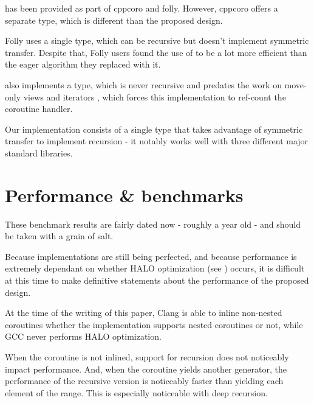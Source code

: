 \documentclass{wg21}
\begin{document}
 has been provided as part of cppcoro and folly.
However, cppcoro offers a separate  type, which is different than the proposed design.

Folly uses a single  type, which can be recursive but doesn't implement symmetric transfer. Despite that,
Folly users found the use of  to be a lot more efficient than the eager algorithm they replaced with it.

 also implements a  type, which is never recursive and predates the work on move-only views and
iterators \cite{P1456R1}, \cite{P1207R0} which forces this implementation to ref-count the coroutine handler.

Our implementation \cite{Implementation} consists of a single type that takes advantage of symmetric transfer to implement
recursion - it notably works well with three different major standard libraries.

\section{Performance \& benchmarks}

\begin{note}
These benchmark results are fairly dated now - roughly a year old - and should be taken with a grain of salt.
\end{note}

Because implementations are still being perfected, and because performance is extremely dependant on whether HALO optimization (see )
occurs, it is difficult at this time to make definitive statements about the performance of the proposed design.

At the time of the writing of this paper, Clang is able to inline non-nested coroutines whether the implementation
supports nested coroutines or not, while GCC never performs HALO optimization.

When the coroutine is not inlined, support for recursion does not noticeably impact performance.
And, when the coroutine yields another generator, the performance of the recursive version is noticeably faster than
yielding each element of the range. This is especially noticeable with deep recursion.
\end{document}
